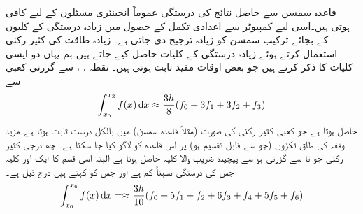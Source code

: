 قاعدہ سمسن  سے حاصل نتائج کی درستگی عموماً انجینئری مسئلوں کے لیے کافی ہوتی ہیں۔اسی لیے کمپیوٹر سے اعدادی تکمل کے حصول میں زیادہ درستگی کے کلیوں کے بجائے  ترکیب سمسن  کو زیادہ ترجیح دی جاتی ہے۔ زیادہ طاقت کی کثیر رکنی استعمال کرتے ہوئے زیادہ درستگی کے کلیات حاصل کیے جاتے ہیں۔ہم یہاں دو ایسی کلیات کا ذکر کرتے ہیں جو بعض اوقات مفید ثابت ہوتی ہیں۔ نقطہ ، ،  سے گزرتی کعبی سے  
\begin{align}\label{مساوات_اعدادی_آٹھ_میں_تین_قاعدہ}
\int_{x_0}^{x_3} f(x)\dif x\approx \frac{3h}{8}(f_0+3f_1+3f_2+f_3)
\end{align}
حاصل ہوتا ہے جو کعبی کثیر رکنی کی صورت (مثلاً قاعدہ سمسن) میں بالکل درست ثابت ہوتا ہے۔مزید  وقفہ کی طاق ٹکڑوں (جو  سے قابل تقسیم ہو) پر اس قاعدہ کو لاگو کیا جا سکتا ہے۔ چھ درجی کثیر رکنی جو  تا  سے گزرتی ہو سے  پیچیدہ  ضریب  والا کلیہ حاصل ہوتا ہے البتہ اسی قسم کا ایک اور کلیہ جس کی درستگی نسبتاً کم ہے اور جس  کو  کہتے ہیں درج ذیل ہے۔
\begin{align}\label{مساوات_اعدادی_ویڈل_قاعدہ}
\int_{x_0}^{x_6} f(x)\dif x=\approx \frac{3h}{10}(f_0+5f_1+f_2+6f_3+f_4+5f_5+f_6)
\end{align}

